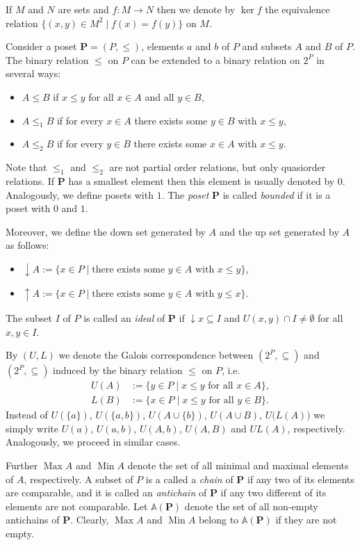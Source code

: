 \documentclass[12pt]{article}
\DeclareMathOperator{\Max}{Max}
\DeclareMathOperator{\Min}{Min}
\begin{document}
If $M$ and $N$ are sets and $f\colon M\to N$ then we denote by $\ker f$ the equivalence relation $\{(x,y)\in M^2\mid f(x)=f(y)\}$ on $M$.

Consider a poset $\mathbf P=(P,\le)$, elements $a$ and $b$ of $P$ and subsets $A$ and $B$ of $P$. The binary relation $\le$ on $P$ can be extended to a binary relation on $2^P$ in several ways:
\begin{itemize}
\item $A\le B$ if $x\le y$ for all $x\in A$ and all $y\in B$,
\item $A\le_1B$ if for every $x\in A$ there exists some $y\in B$ with $x\le y$,
\item $A\le_2B$ if for every $y\in B$ there exists some $x\in A$ with $x\le y$.
\end{itemize}
Note that $\le_1$ and $\le_2$ are not partial order relations, but only quasiorder relations. If $\mathbf P$ has a smallest element then this element is usually denoted by $0$. Analogously, we define posets with $1$. The {\em poset} $\mathbf P$ is called {\em bounded} if it is a poset with $0$ and $1$.


Moreover, we define the down set generated by $A$ and the up set generated by $A$ as follows:
\begin{itemize}
\item $\downarrow A:=\{x\in P\mid\text{there exists some }y\in A\text{ with }x\le y\}$,
\item $\uparrow A:=\{x\in P\mid\text{there exists some }y\in A\text{ with }y\le x\}$.
\end{itemize}
The subset $I$ of $P$ is called an {\em ideal} of $\mathbf P$ if $\downarrow x\subseteq I$ and $U(x,y)\cap I\ne\emptyset$ for all $x,y\in I$.

By $(U,L)$ we denote the Galois correspondence between $(2^P,\subseteq)$ and $(2^P,\subseteq)$ induced by the binary relation $\le$ on $P$, i.e.
\begin{align*}
U(A) & :=\{y\in P\mid x\le y\text{ for all }x\in A\}, \\
L(B) & :=\{x\in P\mid x\le y\text{ for all }y\in B\}.
\end{align*}
Instead of $U(\{a\})$, $U(\{a,b\})$, $U(A\cup\{b\})$, $U(A\cup B)$, $U\big(L(A)\big)$ we simply write $U(a)$, $U(a,b)$, $U(A,b)$, $U(A,B)$ and $UL(A)$, respectively. Analogously, we proceed in similar cases.

Further $\Max A$ and $\Min A$ denote the set of all minimal and maximal elements of $A$, respectively. A subset of $P$ is a called a {\em chain} of $\mathbf P$ if any two of its elements are comparable, and it is called an {\em antichain} of $\mathbf P$ if any two different of its elements are not comparable. Let $\mathbb A(\mathbf P)$ denote the set of all non-empty antichains of $\mathbf P$. Clearly, $\Max A$ and $\Min A$ belong to $\mathbb A(\mathbf P)$ if they are not empty.
\end{document}
